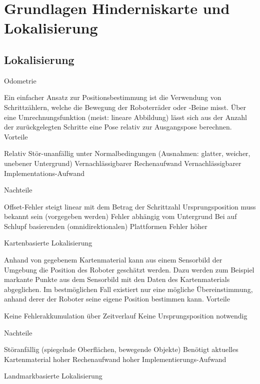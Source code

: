 \section{Grundlagen Hinderniskarte und Lokalisierung}
\label{lokalisierung_grundlagen_sec}
\authorsection{\editordummy}
\subsection{Lokalisierung}
 Odometrie

Ein einfacher Ansatz zur Positionsbestimmung ist die Verwendung von Schrittzählern, welche die Bewegung der Roboterräder oder -Beine misst. Über eine Umrechnungsfunktion (meist: lineare Abbildung) lässt sich aus der Anzahl der zurückgelegten Schritte eine Pose relativ zur Ausgangspose berechnen.
Vorteile

    Relativ Stör-unanfällig unter Normalbedingungen (Ausnahmen: glatter, weicher, unebener Untergrund)
    Vernachlässigbarer Rechenaufwand
    Vernachlässigbarer Implementations-Aufwand 

Nachteile

    Offset-Fehler steigt linear mit dem Betrag der Schrittzahl
    Ursprungsposition muss bekannt sein (vorgegeben werden)
    Fehler abhängig vom Untergrund
    Bei auf Schlupf basierenden (omnidirektionalen) Plattformen Fehler höher 
    
Kartenbasierte Lokalisierung

Anhand von gegebenem Kartenmaterial kann aus einem Sensorbild der Umgebung die Position des Roboter geschätzt werden. Dazu werden zum Beispiel markante Punkte aus dem Sensorbild mit den Daten des Kartenmaterials abgeglichen. Im bestmöglichen Fall existiert nur eine mögliche Übereinstimmung, anhand derer der Roboter seine eigene Position bestimmen kann.
Vorteile

    Keine Fehlerakkumulation über Zeitverlauf
    Keine Ursprungsposition notwendig 

Nachteile

    Störanfällig (spiegelnde Oberflächen, bewegende Objekte)
    Benötigt aktuelles Kartenmaterial
    hoher Rechenaufwand
    hoher Implementierungs-Aufwand 
    
Landmarkbasierte Lokalisierung

